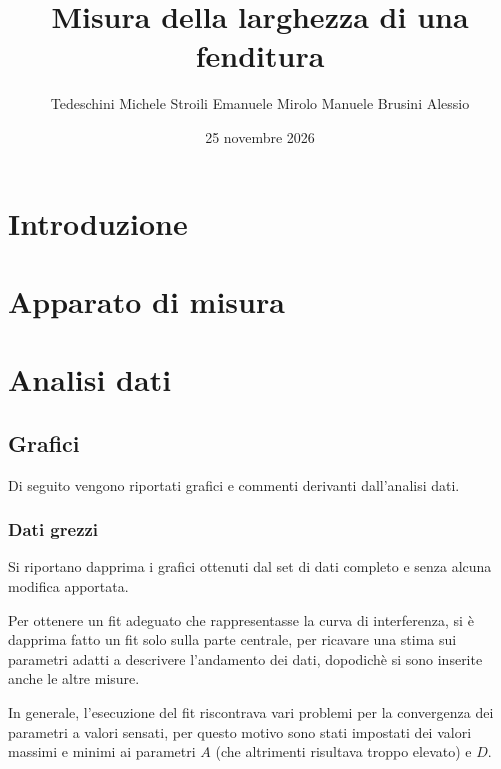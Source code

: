 \documentclass[10pt,twocolumn]{article}
\begin{document}
    \justifying

      \title{\textbf{Misura della larghezza di una fenditura}}
      \author{Tedeschini Michele \hspace{0.7cm} Stroili Emanuele \hspace{0.7cm} Mirolo Manuele \hspace{0.7cm} Brusini Alessio}
      \date{25 novembre 2026}
      \maketitle
      \onecolumn
      \tableofcontents
    \vspace{3cm}
      \begin{abstract}
        \centering
        \large


      \end{abstract}

      \newpage
    \restoregeometry
    \twocolumn
\section{Introduzione}
\section{Apparato di misura}
\section{Analisi dati}
\subsection{Grafici}
Di seguito vengono riportati grafici e commenti derivanti dall'analisi dati.
\subsubsection{Dati grezzi}
Si riportano dapprima i grafici ottenuti dal set di dati completo e senza alcuna modifica apportata.

\noindent Per ottenere un fit adeguato che rappresentasse la curva di interferenza,
si è dapprima fatto un fit solo sulla parte centrale, per ricavare una stima sui parametri adatti a descrivere
l'andamento dei dati, dopodichè si sono inserite anche le altre misure.

\noindent In generale, l'esecuzione del fit riscontrava vari problemi per la convergenza dei parametri a valori sensati,
per questo motivo sono stati impostati dei valori massimi e minimi ai parametri $A$ (che altrimenti risultava troppo elevato) e $D$.
\end{document}
